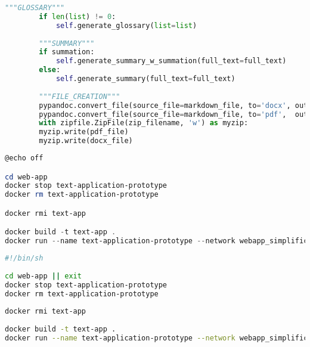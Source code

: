 \begin{lstlisting}[language=Python, caption={Writer-klasse omvattende de code om dynamische PDF- en Word-documenten te genereren.}, label={code:writer-klasse}]
		"""GLOSSARY"""
		if len(list) != 0:
			self.generate_glossary(list=list)
		
		"""SUMMARY"""
		if summation:
			self.generate_summary_w_summation(full_text=full_text)
		else:
			self.generate_summary(full_text=full_text)
	
		"""FILE_CREATION"""
		pypandoc.convert_file(source_file=markdown_file, to='docx', outputfile=docx_file,   extra_args=["-M2GB", "+RTS", "-K64m", "-RTS"])
		pypandoc.convert_file(source_file=markdown_file, to='pdf',  outputfile=pdf_file,    extra_args=['--pdf-engine=xelatex'])
		with zipfile.ZipFile(zip_filename, 'w') as myzip:
		myzip.write(pdf_file)
		myzip.write(docx_file)
\end{lstlisting}


\begin{lstlisting}[language=Powershell, caption={Script voor het opstarten van de Docker-container voor Windows-gebruikers}, label={code:shell-boot}]
@echo off

cd web-app
docker stop text-application-prototype
docker rm text-application-prototype

docker rmi text-app

docker build -t text-app .
docker run --name text-application-prototype --network webapp_simplification -d -p 5000:5000 text-app
\end{lstlisting}

\begin{lstlisting}[language=Bash, caption={Script voor het opstarten van de Docker-container voor Unix-gebruikers}, label={code:bash-boot}]
#!/bin/sh
	
cd web-app || exit
docker stop text-application-prototype
docker rm text-application-prototype
	
docker rmi text-app
	
docker build -t text-app .
docker run --name text-application-prototype --network webapp_simplification -d -p 5000:5000 text-app
\end{lstlisting}